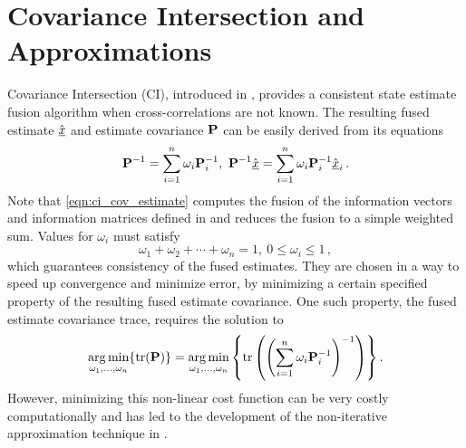 \documentclass[letterpaper, 10 pt, conference]{ieeeconf}  %
\begin{document}
\section{Covariance Intersection and Approximations} \label{sec:ci}
Covariance Intersection (CI), introduced in \cite{julierNondivergentEstimationAlgorithm1997}, provides a consistent state estimate fusion algorithm when cross-correlations are not known. The resulting fused estimate $\hat{{\underline{x}}}$ and estimate covariance ${{\mathbf{P}}}$ can be easily derived from its equations
\begin{equation}
   {\ensuremath{{\mathbf{P}}}}^{-1}=\sum_{i=1}^{n}\omega_i {{\mathbf{P}}}_i^{-1},\ {{\mathbf{P}}}^{-1} \hat{{\underline{x}}} =\sum_{i=1}^{n}\omega_i {{\mathbf{P}}}_i^{-1} \hat{{\underline{x}}}_i\,. \label{eqn:ci_cov_estimate}
\end{equation}
Note that \eqref{eqn:ci_cov_estimate} computes the fusion of the information vectors and information matrices defined in \cite{niehsenInformationFusionBased2002} and reduces the fusion to a simple weighted sum.
Values for $\omega_i$ must satisfy
\begin{equation}
   \omega_1 + \omega_2 + \cdots + \omega_{n} = 1,\ 0 \leq \omega_i \leq 1\,, \label{eqn:ci_omega_sum_bound}
\end{equation}
which guarantees consistency of the fused estimates. They are chosen in a way to speed up convergence and minimize error, by minimizing a certain specified property of the resulting fused estimate covariance. One such property, the fused estimate covariance trace, requires the solution to
\begin{equation}
   \operatorname*{arg\,min}_{\omega_1,\dots,\omega_{n}} \{\operatorname{tr}({{\mathbf{P}}})\} = \operatorname*{arg\,min}_{\omega_1,\dots,\omega_{n}} \left\{\operatorname{tr}\left(\left(\sum_{i=1}^{n}\omega_i {{\mathbf{P}}}_i^{-1}\right)^{-1}\right)\right\}. \label{eqn:ci_trace_min}
\end{equation}
However, minimizing this non-linear cost function can be very costly computationally and has led to the development of the non-iterative approximation technique in \cite{niehsenInformationFusionBased2002}.
\end{document}
